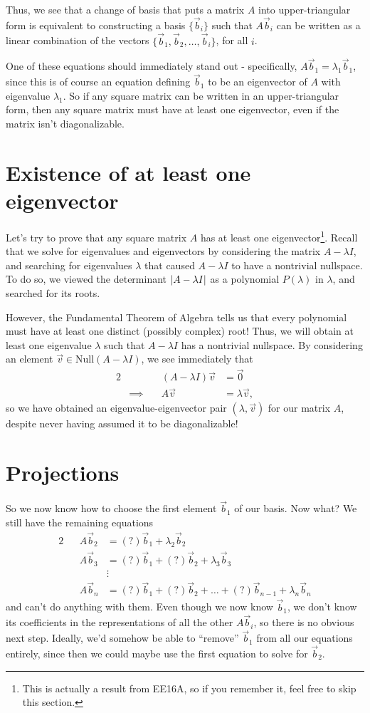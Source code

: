 \documentclass[letterpaper]{article}
\theoremstyle{remark}
\newcommand{\eqn}[1]{\begin{alignat*}{2}#1\end{alignat*}}
\newcommand*{\thus}{&\implies\quad&}
\begin{document}
Thus, we see that a change of basis that puts a matrix $A$ into upper-triangular form is equivalent to constructing a basis $\{ \vec{b}_i \}$ such that $A\vec{b}_i$ can be written as a linear combination of the vectors $\{\vec{b}_1, \vec{b}_2, \ldots, \vec{b}_i\}$, for all $i$.

One of these equations should immediately stand out - specifically, $A\vec{b}_1 = \lambda_1 \vec{b}_1$, since this is of course an equation defining $\vec{b}_1$ to be an eigenvector of $A$ with eigenvalue $\lambda_1$. So if any square matrix can be written in an upper-triangular form, then any square matrix must have at least one eigenvector, even if the matrix isn't diagonalizable. 

\section{Existence of at least one eigenvector}
Let's try to prove that any square matrix $A$ has at least one eigenvector\footnote{This is actually a result from EE16A, so if you remember it, feel free to skip this section.}. Recall that we solve for eigenvalues and eigenvectors by considering the matrix $A - \lambda I$, and searching for eigenvalues $\lambda$ that caused $A - \lambda I$ to have a nontrivial nullspace. To do so, we viewed the determinant $\abs{A - \lambda I}$ as a polynomial $P(\lambda)$ in $\lambda$, and searched for its roots. 

However, the Fundamental Theorem of Algebra tells us that every polynomial must have at least one distinct (possibly complex) root! Thus, we will obtain at least one eigenvalue $\lambda$ such that $A - \lambda I$ has a nontrivial nullspace. By considering an element $\vec{v} \in \text{Null}(A - \lambda I)$, we see immediately that
\eqn{
    && (A - \lambda I) \vec{v} &= \vec{0} \\
    \thus A\vec{v} &= \lambda \vec{v},
}
so we have obtained an eigenvalue-eigenvector pair $(\lambda, \vec{v})$ for our matrix $A$, despite never having assumed it to be diagonalizable!

\section{Projections}
So we now know how to choose the first element $\vec{b}_1$ of our basis. Now what? We still have the remaining equations
\eqn{
    && A\vec{b}_2 &= (?)\vec{b}_1 + \lambda_2 \vec{b}_2 \\
    && A\vec{b}_3 &= (?)\vec{b}_1 + (?)\vec{b}_2 + \lambda_3 \vec{b}_3 \\
    &&& \vdots \\
    && A\vec{b}_n &= (?)\vec{b}_1 + (?)\vec{b}_2 + \ldots +  (?)\vec{b}_{n-1} + \lambda_n \vec{b}_n
}
and can't do anything with them. Even though we now know $\vec{b}_1$, we don't know its coefficients in the representations of all the other $A\vec{b}_i$, so there is no obvious next step. Ideally, we'd somehow be able to ``remove'' $\vec{b}_1$ from all our equations entirely, since then we could maybe use the first equation to solve for $\vec{b}_2$.
\end{document}
